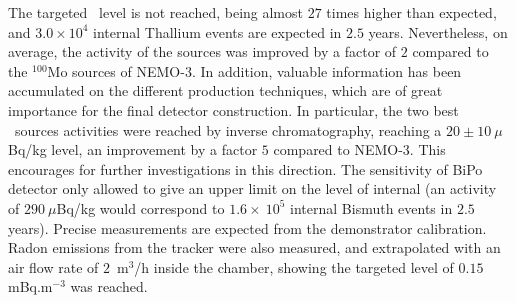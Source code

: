 The targeted \Tl\ level is not reached, being almost $27$ times higher than expected, and $3.0\times 10^{4}$ internal Thallium events are expected in $2.5$ years.
Nevertheless, on average, the activity of the sources was improved by a factor of $2$ compared to the $^{100}$Mo sources of NEMO-$3$.
In addition, valuable information has been accumulated on the different production techniques, which are of great importance for the final detector construction.
In particular, the two best \Tl\ sources activities were reached by inverse chromatography, reaching a $20\pm10~\mu$Bq/kg level, an improvement by a factor $5$ compared to NEMO-$3$.
This encourages for further investigations in this direction.
The sensitivity of BiPo detector only allowed to give an upper limit on the level of internal \Bi(an activity of $290~\mu$Bq/kg would correspond to $1.6\times~10^{5}$ internal Bismuth events in $2.5$ years).
Precise measurements are expected from the demonstrator calibration.
Radon emissions from the tracker were also measured, and extrapolated with an air flow rate of $2$~m$^{3}$/h inside the chamber, showing the targeted level of $0.15$ mBq.m$^{-3}$ was reached.

